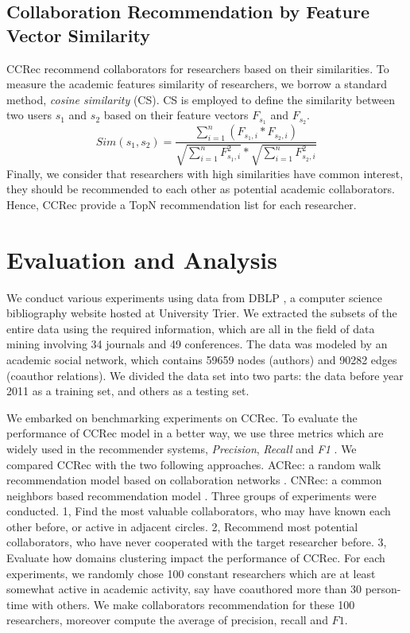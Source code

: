 \documentclass{acm_proc_article-sp}
\begin{document}
\subsection{Collaboration Recommendation by Feature Vector Similarity}
CCRec recommend collaborators for researchers based on their similarities. To measure the academic features similarity of researchers, we borrow a standard method, \emph{cosine similarity} (CS). CS is employed to define the similarity between two users $s_{1}$ and $s_{2}$ based on their feature vectors $F_{s_{1}}$ and $F_{s_{2}}$.
\begin{equation}
Sim(s_{1},s_{2})=\frac{\sum_{i=1}^{n}(F_{s_{1},i}*F_{s_{2},i})}{\sqrt{\sum_{i=1}^{n}F_{s_{1},i}^2}*\sqrt{\sum_{i=1}^{n}F_{s_{2},i}^2}}
\end{equation}
Finally, we consider that researchers with high similarities have common interest, they should be recommended to each other as potential academic collaborators. Hence, CCRec provide a TopN recommendation list for each researcher.

\section{Evaluation and Analysis}
We conduct various experiments using data from DBLP \cite{Ley:DBLP}, a computer science bibliography website hosted at University Trier. We extracted the subsets of the entire data using the required information, which are all in the field of data mining involving 34 journals and 49 conferences. The data was modeled by an academic social network, which contains 59659 nodes (authors) and 90282 edges (coauthor relations). We divided the data set into two parts: the data before year 2011 as a training set, and others as a testing set.

We embarked on benchmarking experiments on CCRec. To evaluate the performance of CCRec model in a better way, we use three metrics which are widely used in the recommender systems, \emph{Precision}, \emph{Recall} and \emph{F1} \cite{shani2011evaluating}. We compared CCRec with the two following approaches. ACRec: a random walk recommendation model based on collaboration networks \cite{li2014acrec}. CNRec: a common neighbors based recommendation model \cite{lopes2010collaboration}. Three groups of experiments were conducted. 1, Find the most valuable collaborators, who may have known each other before, or active in adjacent circles. 2, Recommend most potential collaborators, who have never cooperated with the target researcher before. 3, Evaluate how domains clustering impact the performance of CCRec. For each experiments, we randomly chose 100 constant researchers which are at least somewhat active in academic activity, say have coauthored more than 30 person-time with others. We make collaborators recommendation for these 100 researchers, moreover compute the average of precision, recall and $F1$.
\end{document}
